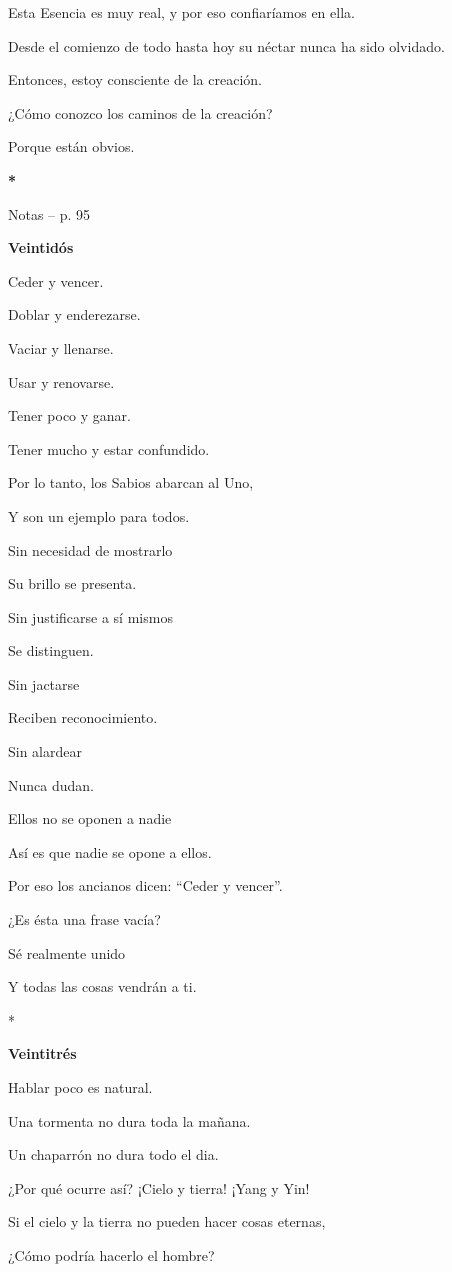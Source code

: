 Esta Esencia es muy real, y por eso confiaríamos en ella.

Desde el comienzo de todo hasta hoy su néctar nunca ha sido olvidado.

Entonces, estoy consciente de la creación.

¿Cómo conozco los caminos de la creación?

Porque están obvios.

\textbf{*}

Notas -- p. 95

\textbf{Veintidós}

Ceder y vencer.

Doblar y enderezarse.

Vaciar y llenarse.

Usar y renovarse.

Tener poco y ganar.

Tener mucho y estar confundido.

Por lo tanto, los Sabios abarcan al Uno,

Y son un ejemplo para todos.

Sin necesidad de mostrarlo

Su brillo se presenta.

Sin justificarse a sí mismos

Se distinguen.

Sin jactarse

Reciben reconocimiento.

Sin alardear

Nunca dudan.

Ellos no se oponen a nadie

Así es que nadie se opone a ellos.

Por eso los ancianos dicen: ``Ceder y vencer''.

¿Es ésta una frase vacía?

Sé realmente unido

Y todas las cosas vendrán a ti.

*

\textbf{Veintitrés}

Hablar poco es natural.

Una tormenta no dura toda la mañana.

Un chaparrón no dura todo el dia.

¿Por qué ocurre así? ¡Cielo y tierra! ¡Yang y Yin!

Si el cielo y la tierra no pueden hacer cosas eternas,

¿Cómo podría hacerlo el hombre?

